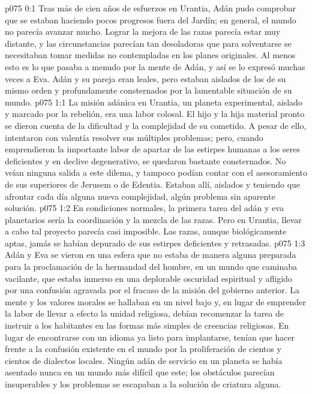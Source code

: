 \author{Solonia}
\vs p075 0:1 Tras más de cien años de esfuerzos en Urantia, Adán pudo comprobar que se estaban haciendo pocos progresos fuera del Jardín; en general, el mundo no parecía avanzar mucho. Lograr la mejora de las razas parecía estar muy distante, y las circunstancias parecían tan desoladoras que para solventarse se necesitaban tomar medidas no contempladas en los planes originales. Al menos esto es lo que pasaba a menudo por la mente de Adán, y así se lo expresó muchas veces a Eva. Adán y su pareja eran leales, pero estaban aislados de los de su mismo orden y profundamente consternados por la lamentable situación de su mundo.
\vs p075 1:1 La misión adánica en Urantia, un planeta experimental, aislado y marcado por la rebelión, era una labor colosal. El hijo y la hija material pronto se dieron cuenta de la dificultad y la complejidad de su cometido. A pesar de ello, intentaron con valentía resolver sus múltiples problemas; pero, cuando emprendieron la importante labor de apartar de las estirpes humanas a los seres deficientes y en declive degenerativo, se quedaron bastante consternados. No veían ninguna salida a este dilema, y tampoco podían contar con el asesoramiento de sus superiores de Jerusem o de Edentia. Estaban allí, aislados y teniendo que afrontar cada día alguna nueva complejidad, algún problema sin aparente solución.
\vs p075 1:2 En condiciones normales, la primera tarea del adán y eva planetarios sería la coordinación y la mezcla de las razas. Pero en Urantia, llevar a cabo tal proyecto parecía casi imposible. Las razas, aunque biológicamente aptas, jamás se habían depurado de sus estirpes deficientes y retrasadas.
\vs p075 1:3 Adán y Eva se vieron en una esfera que no estaba de manera alguna preparada para la proclamación de la hermandad del hombre, en un mundo que caminaba vacilante, que estaba inmerso en una deplorable oscuridad espiritual y afligido por una confusión agravada por el fracaso de la misión del gobierno anterior. La mente y los valores morales se hallaban en un nivel bajo y, en lugar de emprender la labor de llevar a efecto la unidad religiosa, debían recomenzar la tarea de instruir a los habitantes en las formas más simples de creencias religiosas. En lugar de encontrarse con un idioma ya listo para implantarse, tenían que hacer frente a la confusión existente en el mundo por la proliferación de cientos y cientos de dialectos locales. Ningún adán de servicio en un planeta se había asentado nunca en un mundo más difícil que este; los obstáculos parecían insuperables y los problemas se escapaban a la solución de criatura alguna.
